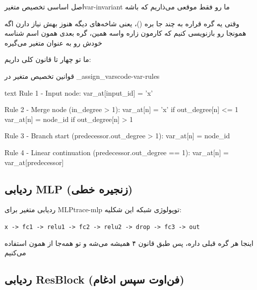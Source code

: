 \documentclass{nngraph-fa}
\begin{document}
\begin{dfnbox}{اصل اساسی تخصیص متغیر}{var-invariant}
ما  رو فقط موقعی می‌ذاریم که  باشه

وقتی یه گره قراره به چند جا بره ()، یعنی شاخه‌های دیگه هنوز بهش نیاز دارن
اگه همونجا  رو بازنویسی کنیم که کارمون زاره
واسه همین، گره بعدی همون اسم شناسه خودش رو به عنوان متغیر می‌گیره
\end{dfnbox}

ما تو  چهار تا قانون کلی داریم:

\begin{codebox}{قوانین تخصیص متغیر در \_assign\_vars}{code-var-rules}
\begin{amzcode}{text}
Rule 1 - Input node:
    var_at[input_id] = 'x'

Rule 2 - Merge node (in_degree > 1):
    var_at[n] = 'x'       if out_degree[n] <= 1
    var_at[n] = node_id   if out_degree[n] > 1

Rule 3 - Branch start (predecessor.out_degree > 1):
    var_at[n] = node_id

Rule 4 - Linear continuation (predecessor.out_degree == 1):
    var_at[n] = var_at[predecessor]
\end{amzcode}
\end{codebox}

\subsection{ردیابی MLP (زنجیره خطی)}

\begin{exbox}{ردیابی متغیر برای MLP}{trace-mlp}
توپولوژی شبکه این شکلیه:
\begin{latin}
\texttt{x -> fc1 -> relu1 -> fc2 -> relu2 -> drop -> fc3 -> out}
\end{latin}

اینجا هر گره قبلی  داره، پس طبق قانون ۴ همیشه  می‌شه
و تو  همه‌جا از همون  استفاده می‌کنیم
\end{exbox}

\subsection{ردیابی ResBlock (فن‌اوت سپس ادغام)}
\end{document}
